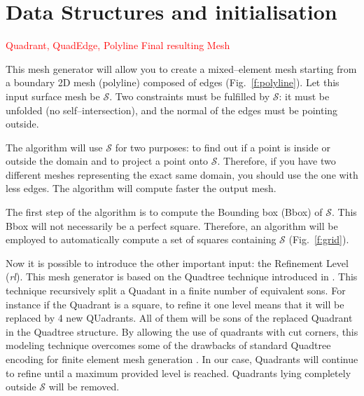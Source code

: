 \documentclass[10pt]{article}
\begin{document}
\section{Data Structures and initialisation}
\label{sec:dataStruct}

\textcolor{red}{Quadrant, QuadEdge, Polyline}
\textcolor{red}{Final resulting Mesh}


This mesh generator will allow you to create a mixed--element mesh starting from a boundary 2D mesh  (polyline) composed of edges (Fig.~\ref{f:polyline}). Let this input surface mesh be $\mathcal{S}$. Two constraints must be fulfilled by $\mathcal{S}$: it must be unfolded (no self--intersection), and the normal of the edges must be pointing outside.

The algorithm will use $\mathcal{S}$ for two purposes: to find out if a point is inside or outside the domain and to project a point onto $\mathcal{S}$. Therefore, if you have two different meshes representing the exact same domain, you should use the one with less edges. The algorithm will compute faster the output mesh.

The first step of the algorithm is to compute the Bounding box (Bbox) of $\mathcal{S}$. This Bbox will not necessarily be a perfect square. Therefore, an algorithm will be employed to automatically compute a set of squares containing $\mathcal{S}$ (Fig.~\ref{f:grid}).

Now it is possible to introduce the other important input: the Refinement Level (\textit{rl}). This mesh generator is based on the  Quadtree technique introduced in \cite{Finkel1974}. This technique recursively split a Quadant in a finite number of equivalent sons. For instance if the Quadrant is a square, to refine it one level means that it will be replaced by 4 new QUadrants. All of them will be sons of the replaced Quadrant in the Quadtree structure. By allowing the use of quadrants with cut corners, this modeling technique overcomes some of the drawbacks of standard Quadtree encoding for finite element mesh generation \cite{Yerry1983}.
In our case, Quadrants will continue to refine until a maximum provided level is reached. Quadrants lying completely outside $\mathcal{S}$ will be removed.\\
\end{document}
